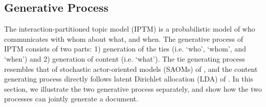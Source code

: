 \documentclass[a4paper]{article}
\begin{document}

\subsection{Generative Process} \label{subsec: Generative Process}
The interaction-partitioned topic model (IPTM) is a probabilistic model of who communicates with whom about what, and when. The generative process of IPTM consists of two parts: 1) generation of the ties (i.e. `who', `whom', and `when') and 2) generation of content (i.e. `what'). The tie generating process resembles that of stochastic actor-oriented models (SAOMs) of \cite{snijders1996stochastic}, and the content generating process directly follows latent Dirichlet allocation (LDA) of \cite{Blei2003}. In this section, we illustrate the two generative process separately, and show how the two processes can jointly generate a document.
\end{document}
